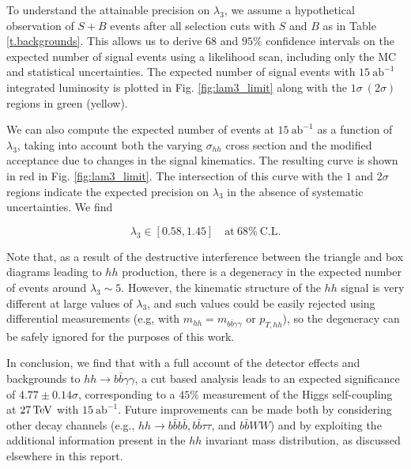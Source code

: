 To understand the attainable precision on $\lambda_{3}$, we assume a hypothetical observation of $S+B$ events after all selection cuts with $S$ and $B$ as in Table \ref{t.backgrounds}. This allows us to derive $68$ and $95\%$ confidence intervals on the expected number of signal events using a likelihood scan, including only the MC and statistical uncertainties. The expected number of signal events with $15~\text{ab}^{-1}$ integrated luminosity is plotted in Fig. \ref{fig:lam3_limit} along with the $1\sigma~(2\sigma)$ regions in green (yellow).

We can also compute the expected number of events at $15~\text{ab}^{-1}$ as a function of $\lambda_{3}$, taking into account both the varying $\sigma_{hh}$ cross section and the modified acceptance due to changes in the signal kinematics. The resulting curve is shown in red in Fig. \ref{fig:lam3_limit}. The intersection of this curve with the $1$ and $2\sigma$ regions indicate the expected precision on $\lambda_3$ in the absence of systematic uncertainties. We find

\begin{equation}
\lambda_{3} \in \left[ 0.58 ,  1.45 \right] \quad \text{at}~ 68\%~\text{C.L.}
\end{equation}

Note that, as a result of the destructive interference between the triangle and box diagrams leading to $hh$ production, there is a degeneracy in the expected number of events around $\lambda_3 \sim 5$. However, the kinematic structure of the $hh$ signal is very different at large values of $\lambda_3$, and such values could be easily rejected using differential measurements (e.g, with $m_{hh} = m_{b\bar{b}\gamma\gamma}$ or $p_{T,hh}$), so the degeneracy can be safely ignored for the purposes of this work.

In conclusion, we find that with a full account of the detector effects and backgrounds to $hh\rightarrow b\bar{b}\gamma\gamma$, a cut based analysis leads to an expected significance of $4.77 \pm 0.14 \sigma$, corresponding to a $45 \%$ measurement of the Higgs self-coupling at $27\, {\rm TeV}$ with $15~\text{ab}^{-1}$. Future improvements can be made both by considering other decay channels (e.g., $hh\rightarrow b\bar{b}b\bar{b}, b\bar{b}\tau\tau$, and $b\bar{b}WW$) and by exploiting the additional information present in the $hh$ invariant mass distribution, as discussed elsewhere in this report.

